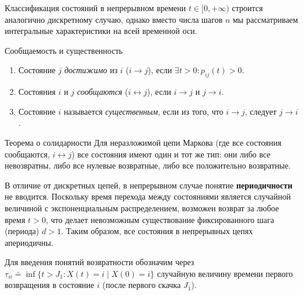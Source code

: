 Классификация состояний в непрерывном времени $t \in [0, +\infty)$ строится аналогично дискретному случаю, однако вместо числа шагов $n$ мы рассматриваем интегральные характеристики на всей временной оси.

\begin{definition}{Сообщаемость и существенность}
    \begin{enumerate}
        \item Состояние $j$ \textit{достижимо} из $i$ ($i \to j$), если $\exists t > 0 : p_{ij}(t) > 0$.
        \item Состояния $i$ и $j$ \textit{сообщаются} ($i \leftrightarrow j$), если $i \to j$ и $j \to i$.
        \item Состояние $i$ называется \textit{существенным}, если из того, что $i \to j$, следует $j \to i$.
    \end{enumerate}
\end{definition}

\begin{theorem}{Теорема о солидарности}
    Для неразложимой цепи Маркова (где все состояния сообщаются, $i \leftrightarrow j$) все состояния имеют один и тот же тип: они либо все невозвратны, либо все нулевые возвратные, либо все положительно возвратные.
\end{theorem}

\begin{note}
В отличие от дискретных цепей, в непрерывном случае понятие \textbf{периодичности} не вводится. Поскольку время перехода между состояниями является случайной величиной с экспоненциальным распределением, возможен возврат за любое время $t > 0$, что делает невозможным существование фиксированного шага (периода) $d > 1$. Таким образом, все состояния в непрерывных цепях апериодичны.
\end{note}

Для введения понятий возвратности обозначим через $\tau_{ii} \doteq \inf \{t > J_1 : X(t) = i \mid X(0) = i\}$ случайную величину времени первого возвращения в состояние $i$ (после первого скачка $J_1$).

